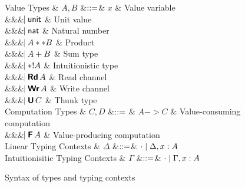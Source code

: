 \documentclass{llncs}
\begin{document}
\begin{figure}[htbp]
  \centering

\begin{grammar}
  Value Types
  & $A,B$
      &$\mathrel{::=}$&
      $x$ & Value variable
      \\ &&& $\hspace{-1.02ex}\mathrel{\mid} \mathsf{unit}$ & Unit value
      \\ &&& $\hspace{-1.02ex}\mathrel{\mid} \mathsf{nat}$         & Natural number
      \\ &&& $\hspace{-1.02ex}\mathrel{\mid} A ** B$ & Product
      \\ &&& $\hspace{-1.02ex}\mathrel{\mid} A + B$ & Sum type
      \\ &&& $\hspace{-1.02ex}\mathrel{\mid} *! A$ & Intuitionistic type
      \\ &&& $\bnfaltbrk \tyRd{A}$ & Read channel
      \\ &&& $\bnfaltbrk \tyWr{A}$ & Write channel
      \\ &&& $\bnfaltbrk \tyU{C}$ & Thunk type
  \\[1ex]
  Computation Types
  & $C, D$
      &$\mathrel{::=}$ & 
             $A -> C$ & Value-consuming computation
      \\ &&& $\bnfaltbrk \tyF{A}$ & Value-producing computation
  \\[1ex]
  Linear Typing Contexts
  & $\Delta$
     &$\mathrel{::=}$& $\cdot \mathrel{\mid} \Delta,x:A$
  \\
  Intuitionisitic Typing Contexts
  & $\Gamma$
     &$\mathrel{::=}$& $\cdot \mathrel{\mid} \Gamma,x:A$
\end{grammar}

  \caption{Syntax of types and typing contexts}
  \label{fig:expr}
\end{figure}
\end{document}
